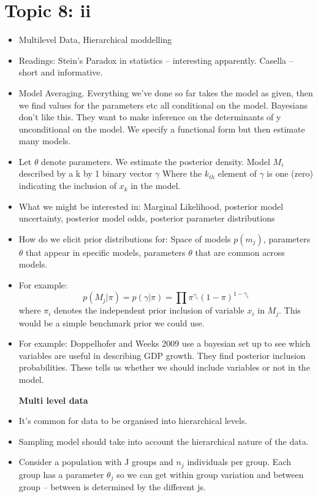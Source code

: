\documentclass[12pt]{article}
\begin{document}
\section*{Topic 8: ii}
\begin{itemize}
      \item Multilevel Data, Hierarchical moddelling
      \item Readings: Stein's Paradox in statistics -- interesting apparently. Casella -- short and informative.
      \item Model Averaging. Everything we've done so far takes the model as given, then we find values for the parameters etc all conditional on the model.
            Bayesians don't like this. They want to make inference on the determinants of y unconditional on the model.
            We specify a functional form but then estimate many models.
      \item Let $\theta$ denote parameters. We estimate the posterior density. Model $M_{i}$ described by a k by 1 binary vector $\gamma$
            Where the $k_{th}$ element of $\gamma$ is one (zero) indicating the inclusion of $x_{k}$ in the model.
      \item What we might be interested in: Marginal Likelihood, posterior model uncertainty,
            posterior model odds, posterior parameter distributions

      \item How do we elicit prior distributions for: Space of models $p(m_{j})$, parameters $\theta$ that appear in specific models, parameters $\theta$ that are common across models.
      \item For example:
            $$p(M_{j}|\pi) = p(\gamma | \pi) = \prod \pi^{\gamma_{i}}(1-\pi)^{1 - \gamma_{i}}$$
            where $\pi_{i}$ denotes the independent prior inclusion of variable $x_{i}$ in $M_{j}$.
            This would be a simple benchmark prior we could use.

      \item For example: Doppelhofer and Weeks 2009 use a bayesian set up to see which variables are useful in describing GDP growth.
            They find posterior inclusion probabilities. These tells us whether we should include variables or not in the model.

            \textbf{Multi level data}

      \item It's common for data to be organised into hierarchical levels.

      \item Sampling model should take into account the hierarchical nature of the data.
      \item Consider a population with J groups and $n_{j}$ individuals per group.
            Each group has a parameter $\theta_{j}$ so we can get within group variation and between group -- between is determined by the different js.


\end{itemize}
\end{document}
